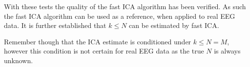 With these tests the quality of the fast ICA algorithm has been verified. As such the fast ICA algorithm can be used as a reference, when applied to real EEG data. It is further established that $k\leq N$ can be estimated by fast ICA. 

Remember though that the ICA estimate is conditioned under $k\leq N=M$, however this condition is not certain for real EEG data as the true $N$ is always unknown.   











  


